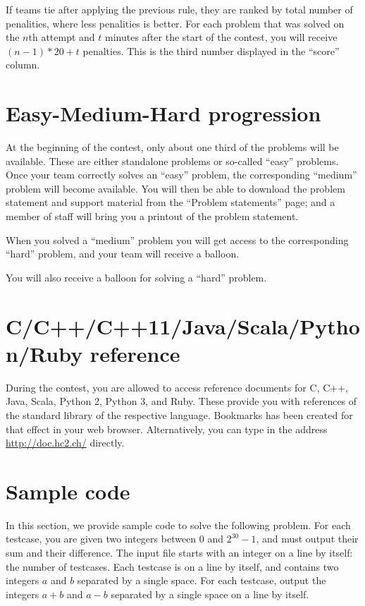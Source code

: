If teams tie after applying the previous rule, they are ranked by total number of penalities, where less penalities is better. For each problem that was solved on the $n$th attempt and
$t$ minutes after the start of the contest,
you will receive $(n-1)*20+t$ penalties.
This is the third number displayed in the ``score'' column.

\section{Easy-Medium-Hard progression}
At the beginning of the contest, only about one third of the problems will be available.
These are either standalone problems or so-called ``easy'' problems.
Once your team correctly solves an ``easy'' problem, the corresponding
``medium'' problem will become available. You will then be able to download the
problem statement and support material from the ``Problem statements'' page;
and a member of staff will bring you a printout of the problem statement.

When you solved a ``medium'' problem you will get access to the corresponding
``hard'' problem, and your team will receive a balloon.

You will also receive a balloon for solving a ``hard'' problem.

\section{C/C++/C++11/Java/Scala/Python/Ruby reference}
During the contest, you are allowed to access reference documents for C, C++, Java, Scala, Python 2, Python 3, and Ruby.
These provide you with references of the standard library of the
respective language.
Bookmarks has been created for that effect in your
web browser. Alternatively, you can type in the address
\url{http://doc.hc2.ch/} directly.

\section{Sample code}
\label{codeexamples}

In this section, we provide sample code to solve the following problem.
For each testcase, you are given two integers between 0 and $2^{30}-1$, and must output their sum and their difference.
The input file starts with an integer on a line by itself: the number of testcases.
Each testcase is on a line by itself, and contains two integers $a$ and $b$ separated by a single space.
For each testcase, output the integers $a+b$ and $a-b$ separated by a single space on a line by itself.

